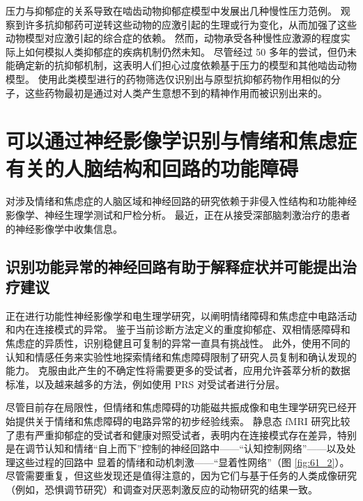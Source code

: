 压力与抑郁症的关系导致在啮齿动物抑郁症模型中发展出几种慢性压力范例。 观察到许多抗抑郁药可逆转这些动物的应激引起的生理或行为变化，从而加强了这些动物模型对应激引起的综合症的依赖。 然而，动物承受各种慢性应激源的程度实际上如何模拟人类抑郁症的疾病机制仍然未知。 尽管经过 50 多年的尝试，但仍未能确定新的抗抑郁机制，这表明人们担心过度依赖基于压力的模型和其他啮齿动物模型。 使用此类模型进行的药物筛选仅识别出与原型抗抑郁药物作用相似的分子，这些药物最初是通过对人类产生意想不到的精神作用而被识别出来的。

\section{可以通过神经影像学识别与情绪和焦虑症有关的人脑结构和回路的功能障碍}
对涉及情绪和焦虑症的人脑区域和神经回路的研究依赖于非侵入性结构和功能神经影像学、神经生理学测试和尸检分析。 最近，正在从接受深部脑刺激治疗的患者的神经影像学中收集信息。

\subsection{识别功能异常的神经回路有助于解释症状并可能提出治疗建议}
正在进行功能性神经影像学和电生理学研究，以阐明情绪障碍和焦虑症中电路活动和内在连接模式的异常。 鉴于当前诊断方法定义的重度抑郁症、双相情感障碍和焦虑症的异质性，识别稳健且可复制的异常一直具有挑战性。 此外，使用不同的认知和情感任务来实验性地探索情绪和焦虑障碍限制了研究人员复制和确认发现的能力。 克服由此产生的不确定性将需要更多的受试者，应用允许荟萃分析的数据标准，以及越来越多的方法，例如使用 PRS 对受试者进行分层。

尽管目前存在局限性，但情绪和焦虑障碍的功能磁共振成像和电生理学研究已经开始提供关于情绪和焦虑障碍的电路异常的初步经验线索。 静息态 fMRI 研究比较了患有严重抑郁症的受试者和健康对照受试者，表明内在连接模式存在差异，特别是在调节认知和情绪“自上而下”控制的神经回路中——“认知控制网络”——以及处理这些过程的回路中 显着的情绪和动机刺激——“显着性网络”（图 \ref{fig:61_2}）。 尽管需要重复，但这些发现还是值得注意的，因为它们与基于任务的人类成像研究（例如，恐惧调节研究）和调查对厌恶刺激反应的动物研究的结果一致。

